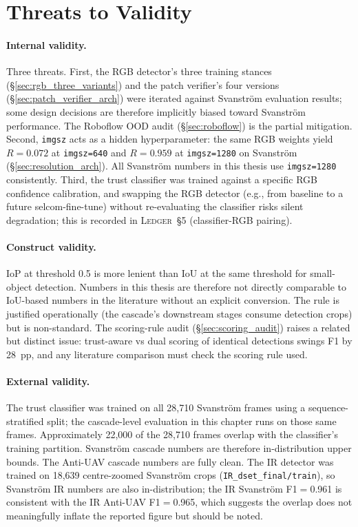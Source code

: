 \documentclass[12pt,a4paper,oneside,openright]{book}
\begin{document}
\section{Threats to Validity}
\label{sec:threats}

\paragraph{Internal validity.}
Three threats. First, the RGB detector's three training stances (\S\ref{sec:rgb_three_variants}) and the patch verifier's four versions (\S\ref{sec:patch_verifier_arch}) were iterated against Svanstr\"om evaluation results; some design decisions are therefore implicitly biased toward Svanstr\"om performance. The Roboflow OOD audit (\S\ref{sec:roboflow}) is the partial mitigation. Second, \texttt{imgsz} acts as a hidden hyperparameter: the same RGB weights yield $R=0.072$ at \texttt{imgsz=640} and $R=0.959$ at \texttt{imgsz=1280} on Svanstr\"om (\S\ref{sec:resolution_arch}). All Svanstr\"om numbers in this thesis use \texttt{imgsz=1280} consistently. Third, the trust classifier was trained against a specific RGB confidence calibration, and swapping the RGB detector (e.g., from baseline to a future selcom-fine-tune) without re-evaluating the classifier risks silent degradation; this is recorded in \textsc{Ledger}~\S5 (classifier-RGB pairing).

\paragraph{Construct validity.}
IoP at threshold 0.5 is more lenient than IoU at the same threshold for small-object detection. Numbers in this thesis are therefore not directly comparable to IoU-based numbers in the literature without an explicit conversion. The rule is justified operationally (the cascade's downstream stages consume detection crops) but is non-standard. The scoring-rule audit (\S\ref{sec:scoring_audit}) raises a related but distinct issue: trust-aware vs dual scoring of identical detections swings F1 by 28~pp, and any literature comparison must check the scoring rule used.

\paragraph{External validity.}
The trust classifier was trained on all 28,710 Svanstr\"om frames using a sequence-stratified split; the cascade-level evaluation in this chapter runs on those same frames. Approximately 22,000 of the 28,710 frames overlap with the classifier's training partition. Svanstr\"om cascade numbers are therefore in-distribution upper bounds. The Anti-UAV cascade numbers are fully clean. The IR detector was trained on 18,639 centre-zoomed Svanstr\"om crops (\texttt{IR\_dset\_final/train}), so Svanstr\"om IR numbers are also in-distribution; the IR Svanstr\"om F1$=$0.961 is consistent with the IR Anti-UAV F1$=$0.965, which suggests the overlap does not meaningfully inflate the reported figure but should be noted.
\end{document}
